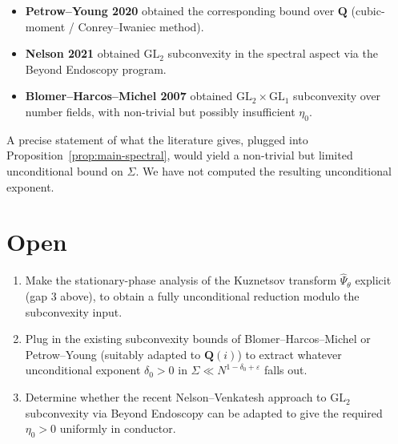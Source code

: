 \documentclass[11pt]{article}
\theoremstyle{definition}
\newcommand{\Q}{\mathbf{Q}}
\begin{document}
\begin{itemize}
\item \textbf{Petrow--Young 2020} \cite{petrow-young} obtained the corresponding bound over $\Q$ (cubic-moment / Conrey--Iwaniec method).
\item \textbf{Nelson 2021} \cite{nelson} obtained $\mathrm{GL}_2$ subconvexity in the spectral aspect via the Beyond Endoscopy program.
\item \textbf{Blomer--Harcos--Michel 2007} \cite{BHM} obtained $\mathrm{GL}_2\times\mathrm{GL}_1$ subconvexity over number fields, with non-trivial but possibly insufficient $\eta_0$.
\end{itemize}

A precise statement of what the literature gives, plugged into Proposition~\ref{prop:main-spectral}, would yield a non-trivial but limited unconditional bound on $\Sigma$. We have not computed the resulting unconditional exponent.

\section{Open}\label{sec:open}

\begin{enumerate}
\item Make the stationary-phase analysis of the Kuznetsov transform $\widehat\Psi_\theta$ explicit (gap 3 above), to obtain a fully unconditional reduction modulo the subconvexity input.
\item Plug in the existing subconvexity bounds of Blomer--Harcos--Michel \cite{BHM} or Petrow--Young \cite{petrow-young} (suitably adapted to $\Q(i)$) to extract whatever unconditional exponent $\delta_0>0$ in $\Sigma\ll N^{1-\delta_0+\varepsilon}$ falls out.
\item Determine whether the recent Nelson--Venkatesh \cite{nelson-venkatesh} approach to $\mathrm{GL}_2$ subconvexity via Beyond Endoscopy can be adapted to give the required $\eta_0>0$ uniformly in conductor.
\end{enumerate}
\end{document}
